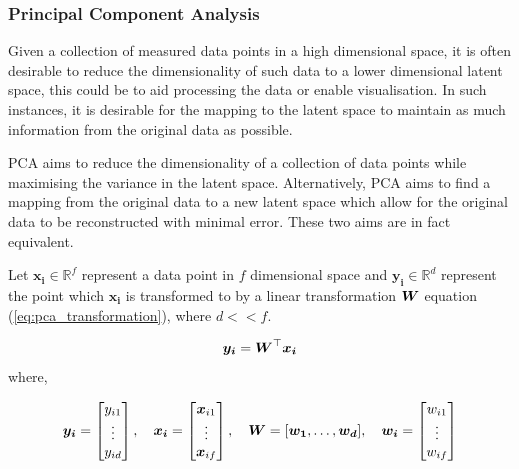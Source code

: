 \subsubsection{Principal Component Analysis} \label{sec:pca}
Given a collection of measured data points in a high dimensional space, it is often desirable to reduce the dimensionality of such data to a lower dimensional latent space, this could be to aid processing the data or enable visualisation.
In such instances, it is desirable for the mapping to the latent space to maintain as much information from the original data as possible.

PCA aims to reduce the dimensionality of a collection of data points while maximising the variance in the latent space.
Alternatively, PCA aims to find a mapping from the original data to a new latent space which allow for the original data to be reconstructed with minimal error.
These two aims are in fact equivalent.

Let $\bm{x_i} \in \mathbb{R}^f$ represent a data point in $f$ dimensional space and $\bm{y_i} \in \mathbb{R}^d$ represent the point which $\bm{x_i}$ is transformed to by a linear transformation ${\boldsymbol{{W}}}$ equation (\ref{eq:pca_transformation}), where $d << f$.

\begin{equation} \label{eq:pca_transformation}
    {\boldsymbol{{y_i}}} = {\boldsymbol{{W}}}^\top {\boldsymbol{{x_i}}}
\end{equation}
where,

\begin{equation*}
    {\boldsymbol{{y_i}}} = \begin{bmatrix} 
                y_{i1} \\
                \vdots \\
                y_{id} 
               \end{bmatrix},
    \quad
    {\boldsymbol{{x_i}}} = \begin{bmatrix} 
                {\boldsymbol{{x}}}_{i1} \\
                \vdots \\
                {\boldsymbol{{x}}}_{if} 
               \end{bmatrix},
    \quad
    {\boldsymbol{{W}}} = [
               {\boldsymbol{{w_1}}}, \dots, {\boldsymbol{{w_d}}}
              ],
    \quad
    {\boldsymbol{{w_i}}} = \begin{bmatrix} 
                w_{i1} \\
                \vdots \\
                w_{if} 
               \end{bmatrix}
\end{equation*}

